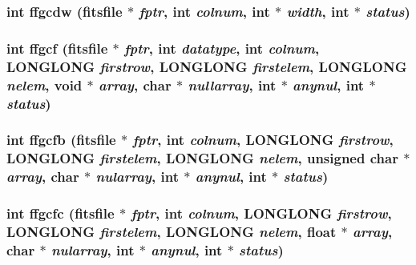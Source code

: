 \subsubsection{\setlength{\rightskip}{0pt plus 5cm}int ffgcdw (\bf{fitsfile} $\ast$ {\em fptr}, int {\em colnum}, int $\ast$ {\em width}, int $\ast$ {\em status})}\label{src_2fitsio_8h_ae9a8c205e4900ba5d06b4ea71a5ed2e}


\subsubsection{\setlength{\rightskip}{0pt plus 5cm}int ffgcf (\bf{fitsfile} $\ast$ {\em fptr}, int {\em datatype}, int {\em colnum}, \bf{LONGLONG} {\em firstrow}, \bf{LONGLONG} {\em firstelem}, \bf{LONGLONG} {\em nelem}, void $\ast$ {\em array}, char $\ast$ {\em nullarray}, int $\ast$ {\em anynul}, int $\ast$ {\em status})}\label{src_2fitsio_8h_8bad8cda622bdd1ba30e3f5adcb1077f}


\subsubsection{\setlength{\rightskip}{0pt plus 5cm}int ffgcfb (\bf{fitsfile} $\ast$ {\em fptr}, int {\em colnum}, \bf{LONGLONG} {\em firstrow}, \bf{LONGLONG} {\em firstelem}, \bf{LONGLONG} {\em nelem}, unsigned char $\ast$ {\em array}, char $\ast$ {\em nularray}, int $\ast$ {\em anynul}, int $\ast$ {\em status})}\label{src_2fitsio_8h_bd592166bad248d7ca43c0e8e77b1596}


\subsubsection{\setlength{\rightskip}{0pt plus 5cm}int ffgcfc (\bf{fitsfile} $\ast$ {\em fptr}, int {\em colnum}, \bf{LONGLONG} {\em firstrow}, \bf{LONGLONG} {\em firstelem}, \bf{LONGLONG} {\em nelem}, float $\ast$ {\em array}, char $\ast$ {\em nularray}, int $\ast$ {\em anynul}, int $\ast$ {\em status})}\label{src_2fitsio_8h_6dee15a7ea96a9b97cb01f09f0cc789e}



